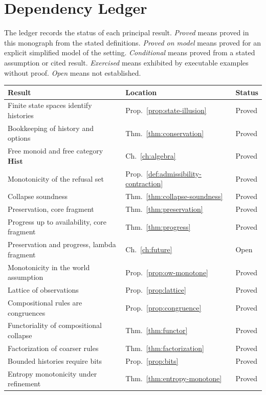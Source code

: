 \documentclass[12pt,oneside,openany]{book}
\theoremstyle{spherepop}
\theoremstyle{remarkstyle}
\newcommand{\Hist}{\mathbf{Hist}}
\begin{document}
\chapter{Dependency Ledger}
\label{app:ledger}

The ledger records the status of each principal result. \emph{Proved} means proved in this monograph from the stated definitions. \emph{Proved on model} means proved for an explicit simplified model of the setting. \emph{Conditional} means proved from a stated assumption or cited result. \emph{Exercised} means exhibited by executable examples without proof. \emph{Open} means not established.

\medskip
\begin{center}
\small
\begin{longtable}{p{}p{}p{}}
\toprule
Result & Location & Status \\
\midrule
\endhead
Finite state spaces identify histories & Prop.~\ref{prop:state-illusion} & Proved \\
Bookkeeping of history and options & Thm.~\ref{thm:conservation} & Proved \\
Free monoid and free category $\Hist$ & Ch.~\ref{ch:algebra} & Proved \\
Monotonicity of the refusal set & Prop.~\ref{def:admissibility-contraction} & Proved \\
Collapse soundness & Thm.~\ref{thm:collapse-soundness} & Proved \\
Preservation, core fragment & Thm.~\ref{thm:preservation} & Proved \\
Progress up to availability, core fragment & Thm.~\ref{thm:progress} & Proved \\
Preservation and progress, lambda fragment & Ch.~\ref{ch:future} & Open \\
Monotonicity in the world assumption & Prop.~\ref{prop:ow-monotone} & Proved \\
Lattice of observations & Prop.~\ref{prop:lattice} & Proved \\
Compositional rules are congruences & Prop.~\ref{prop:congruence} & Proved \\
Functoriality of compositional collapse & Thm.~\ref{thm:functor} & Proved \\
Factorization of coarser rules & Thm.~\ref{thm:factorization} & Proved \\
Bounded histories require bits & Prop.~\ref{prop:bits} & Proved \\
Entropy monotonicity under refinement & Thm.~\ref{thm:entropy-monotone} & Proved \\

\end{longtable}
\end{center}
\end{document}
